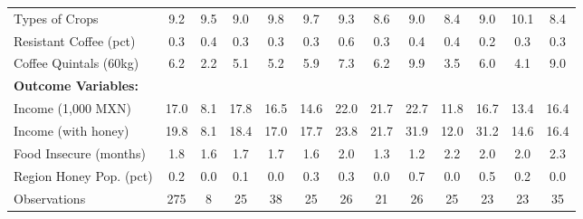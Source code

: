 \begin{table}[htbp]
\begin{tabular}{l*{12}{c}}
\addlinespace
Types of Crops  &      9.2&      9.5&      9.0&      9.8&      9.7&      9.3&      8.6&      9.0&      8.4&      9.0&     10.1&      8.4\\
\addlinespace
Resistant Coffee (pct)&      0.3&      0.4&      0.3&      0.3&      0.3&      0.6&      0.3&      0.4&      0.4&      0.2&      0.3&      0.3\\
\addlinespace
Coffee Quintals (60kg)&      6.2&      2.2&      5.1&      5.2&      5.9&      7.3&      6.2&      9.9&      3.5&      6.0&      4.1&      9.0\\
\addlinespace
\textbf{Outcome Variables:}&         &         &         &         &         &         &         &         &         &         &         &         \\
\addlinespace
Income (1,000 MXN)&     17.0&      8.1&     17.8&     16.5&     14.6&     22.0&     21.7&     22.7&     11.8&     16.7&     13.4&     16.4\\
\addlinespace
Income (with honey)&     19.8&      8.1&     18.4&     17.0&     17.7&     23.8&     21.7&     31.9&     12.0&     31.2&     14.6&     16.4\\
\addlinespace
Food Insecure (months)&      1.8&      1.6&      1.7&      1.7&      1.6&      2.0&      1.3&      1.2&      2.2&      2.0&      2.0&      2.3\\
\addlinespace
Region Honey Pop. (pct)&      0.2&      0.0&      0.1&      0.0&      0.3&      0.3&      0.0&      0.7&      0.0&      0.5&      0.2&      0.0\\
\midrule
Observations    &      275&        8&       25&       38&       25&       26&       21&       26&       25&       23&       23&       35\\
\bottomrule
\end{tabular}
\end{table}
